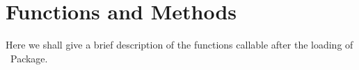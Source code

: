 \section{Functions and Methods}

Here we shall give a brief description of the functions callable after the loading of \Metro\, Package.	